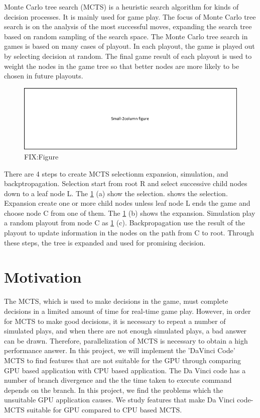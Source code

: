 \documentclass[conference]{IEEEtran}
\begin{document}
Monte Carlo tree search (MCTS) is a heuristic search algorithm for kinds of decision processes.
It is mainly used for game play.  
The focus of Monte Carlo tree search is on the analysis of the most successful moves, expanding the search tree based on random sampling of the search space. 
The Monte Carlo tree search in games is based on many cases of playout. 
In each playout, the game is played out by selecting decision at random. 
The final game result of each playout is used to weight the nodes in the game tree so that better nodes are more likely to be chosen in future playouts.
\begin{figure}
\includegraphics{figures/fit_2col.pdf}
\caption{FIX:Figure}
\label{fig:MCTS_step}
\end{figure}

There are 4 steps to create MCTS selectionm expansion, simulation, and backptropagation.
Selection start from root R and select successive child nodes down to a leaf node L. The \cref{fig:MCTS_step} (a) show the selection. shows the selection.
Expansion create one or more child nodes unless leaf node L ends the game and choose node C from one of them. The \cref{fig:MCTS_step} (b) shows the expansion.
Simulation play a random playout from node C as \cref{fig:MCTS_step} (c).
Backpropagation use the result of the playout to update information in the nodes on the path from C to root. 
Through these steps, the tree is expanded and used for promising decision.

\section{Motivation}
The MCTS, which is used to make decisions in the game, must complete decisions in a limited amount of time for real-time game play. 
However, in order for MCTS to make good decisions, it is necessary to repeat a number of simulated plays, and when there are not enough simulated plays, a bad answer can be drawn. 
Therefore, parallelization of MCTS is necessary to obtain a high performance answer.
In this project, we will implement the 'DaVinci Code' MCTS to find features that are not suitable for the GPU through comparing GPU based application with CPU based application.
The Da Vinci code has a number of branch divergence and the the time taken to execute command depends on the branch.
In this project, we find the problems which the unsuitable GPU application causes.
We study features that make Da Vinci code-MCTS suitable for GPU compared to CPU based MCTS.
\end{document}

